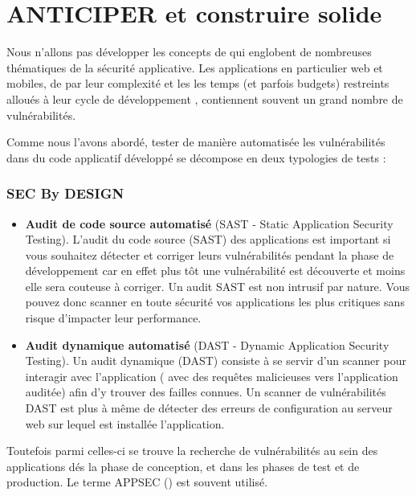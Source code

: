 
\section{ANTICIPER et construire solide}

Nous n'allons pas développer les concepts de  qui  englobent de nombreuses thématiques de la sécurité applicative.
Les applications en particulier web et mobiles, de par leur complexité et les les temps (et parfois budgets) restreints alloués à leur cycle de développement , contiennent souvent un grand nombre de vulnérabilités.

Comme nous l'avons abordé, tester de manière automatisée les vulnérabilités dans du code applicatif développé se décompose en deux typologies de tests :

\begin{frame}
\frametitle<presentation>{SEC By DESIGN}
\begin{itemize}
  \item  \textbf{Audit de code source automatisé} (SAST - Static Application Security Testing). L’audit du code source (SAST) des applications est important si vous souhaitez détecter et corriger leurs vulnérabilités pendant la phase de développement car en effet plus tôt une vulnérabilité est découverte et moins elle sera couteuse à corriger.
Un audit SAST est non intrusif par nature. Vous pouvez donc scanner en toute sécurité vos applications les plus critiques sans risque d’impacter leur performance.
  \item   \textbf{Audit dynamique automatisé }(DAST - Dynamic Application Security Testing). Un audit dynamique (DAST) consiste à se servir d’un scanner pour interagir avec l’application ( avec des requêtes malicieuses vers l’application auditée)  afin d’y trouver des failles connues.
Un scanner de vulnérabilités DAST est plus à même de détecter des erreurs de configuration au serveur web sur lequel est installée l’application.

\end{itemize}
\end{frame}

Toutefois parmi celles-ci se trouve la recherche de vulnérabilités au sein des applications dés la phase de conception, et dans les phases de test et de production. Le terme APPSEC () est souvent utilisé.

